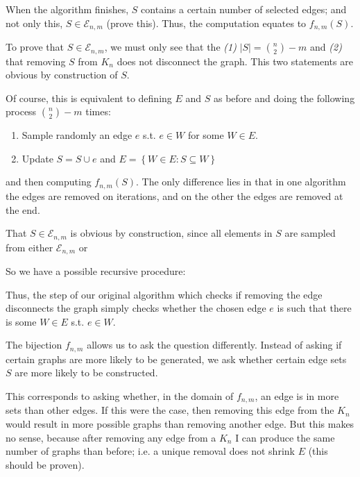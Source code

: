 \documentclass[a4paper, 12pt]{article}
\begin{document}
When the algorithm finishes, $S$ contains a certain number of selected edges;
and not only this, $S \in \mathcal{E}_{n,m}$ (prove this). Thus, the
computation equates to $f_{n,m}(S)$.

To prove that $S \in \mathcal{E}_{n,m}$, we must only see that the \textit{(1)}
$|S| = \binom{n}{2} - m$ and \textit{(2)} that removing $S$ from $K_n$ does not
disconnect the graph. This two statements are obvious by construction of $S$.


\pagebreak

Of course, this is equivalent to defining $E$ and $S$ as before and doing the following process $\binom{n}{2} - m$ times:

\begin{enumerate}
    \item Sample randomly an edge $e$ s.t. $e \in W$ for some $W \in E$. 
    \item Update $S = S \cup e $ and $E = \left\{ W \in E : S \subseteq W \right\} $
\end{enumerate}

and then computing $f_{n,m}(S)$. The only difference lies in that in one
algorithm the edges are removed on iterations, and on the other the edges are
removed at the end. 

That $S \in \mathcal{E}_{n, m}$ is obvious by construction, 
since all elements in $S$ are sampled from either $\mathcal{E}_{n,m}$
or 

So we have a possible recursive procedure:

Thus, the step of our original algorithm which checks if removing the edge
disconnects the graph simply checks whether the chosen edge $e$ is such that
there is some $W \in E$ s.t. $e \in W$.

The bijection $f_{n, m}$ allows us to ask the question differently. Instead of
asking if certain graphs are more likely to be generated, we ask whether
certain edge sets $S$ are more likely to be constructed. 

This corresponds to asking whether, in the domain of $f_{n,m}$, an edge is in
more sets than other edges. If this were the case, then removing this edge from
the $K_n$ would result in more possible graphs than removing another edge. But
this makes no sense, because after removing any edge from a $K_n$ I can produce
the same number of graphs than before; i.e. a unique removal does not shrink
$E$ (this should be proven).
\end{document}
